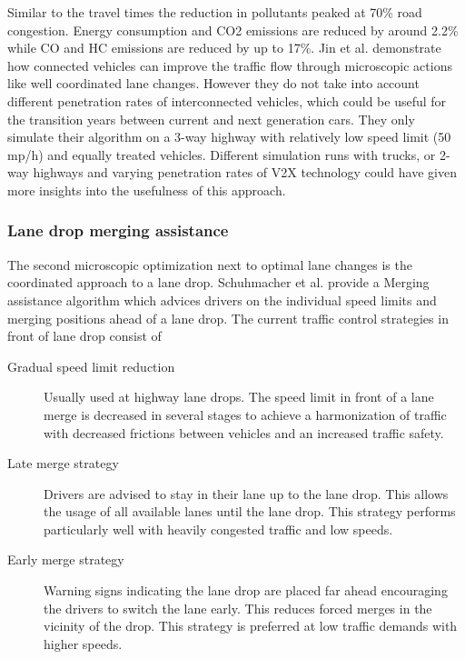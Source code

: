 \documentclass{sig-alternate}
\begin{document}
Similar to the travel times the reduction in pollutants peaked at 70\% road congestion. Energy consumption and CO2 emissions are reduced by around 2.2\% while CO and HC emissions are reduced by up to 17\%. Jin et al. demonstrate how connected vehicles can improve the traffic flow through microscopic actions like well coordinated lane changes. However they do not take into account different penetration rates of interconnected vehicles, which could be useful for the transition years between current and next generation cars. They only simulate their algorithm on a 3-way highway with relatively low speed limit (50 mp/h) and equally treated vehicles. Different simulation runs with trucks, or 2-way highways and  varying penetration rates of V2X technology could have given more insights into the usefulness of this approach. 
\subsubsection{Lane drop merging assistance}
The second microscopic optimization next to optimal lane changes is the coordinated approach to a lane drop. Schuhmacher et al.\cite{1614269.1614274} provide a Merging assistance algorithm which advices drivers on the individual speed limits and merging positions ahead of a lane drop. The current traffic control strategies in front of lane drop consist of
\begin{description}
\item[Gradual speed limit reduction] Usually used at highway lane drops. The speed limit in front of a lane merge is decreased in several stages to achieve a harmonization of traffic with decreased frictions between vehicles and an increased traffic safety.
\item[Late merge strategy] Drivers are advised to stay in their lane up to the lane drop. This allows the usage of all available lanes until the lane drop. This strategy performs particularly well with heavily congested traffic and low speeds. 
\item [Early merge strategy] Warning signs indicating the lane drop are placed far ahead encouraging the drivers to switch the lane early. This reduces forced merges in the vicinity of the drop. This strategy is preferred at low traffic demands with higher speeds.  
\end{description} 
\end{document}
